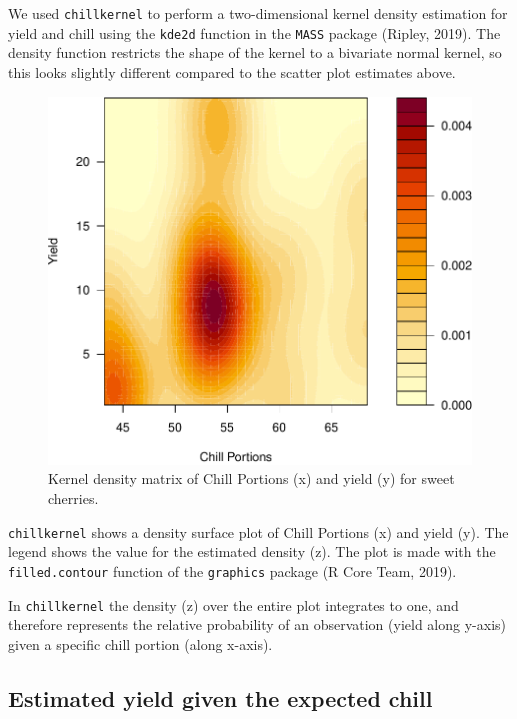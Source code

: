 \documentclass[]{article}
\begin{document}
We used \texttt{chillkernel} to perform a two-dimensional kernel density
estimation for yield and chill using the \texttt{kde2d} function in the
\texttt{MASS} package (Ripley, 2019). The density function restricts the
shape of the kernel to a bivariate normal kernel, so this looks slightly
different compared to the scatter plot estimates above.

\begin{figure}
\centering
\includegraphics{Abstract_SHE_Chill_Yield_Model_files/figure-latex/unnamed-chunk-3-1.pdf}
\caption{Kernel density matrix of Chill Portions (x) and yield (y) for
sweet cherries.}
\end{figure}

\texttt{chillkernel} shows a density surface plot of Chill Portions (x)
and yield (y). The legend shows the value for the estimated density (z).
The plot is made with the \texttt{filled.contour} function of the
\texttt{graphics} package (R Core Team, 2019).

In \texttt{chillkernel} the density (z) over the entire plot integrates
to one, and therefore represents the relative probability of an
observation (yield along y-axis) given a specific chill portion (along
x-axis).

\hypertarget{estimated-yield-given-the-expected-chill}{%
\subsection{Estimated yield given the expected
chill}\label{estimated-yield-given-the-expected-chill}}
\end{document}
